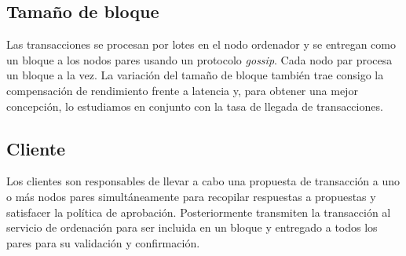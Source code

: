\subsection{Tama\~no de bloque}
Las transacciones se procesan por lotes en el nodo ordenador y se entregan como un bloque a los nodos pares usando un protocolo \emph{gossip}. Cada nodo par procesa un bloque a la vez. La variaci\'on del tama\~no de bloque tambi\'en trae consigo la compensaci\'on de rendimiento frente a latencia y, para obtener una mejor concepci\'on, lo estudiamos en conjunto con la tasa de llegada de transacciones.

\subsection{Cliente}
Los clientes son responsables de llevar a cabo una propuesta de transacci\'on a uno o m\'as nodos pares simult\'aneamente para recopilar respuestas a propuestas y satisfacer la pol\'itica de aprobaci\'on. Posteriormente transmiten la transacci\'on al servicio de ordenaci\'on para ser incluida en un bloque y entregado a todos los pares para su validaci\'on y confirmaci\'on.

